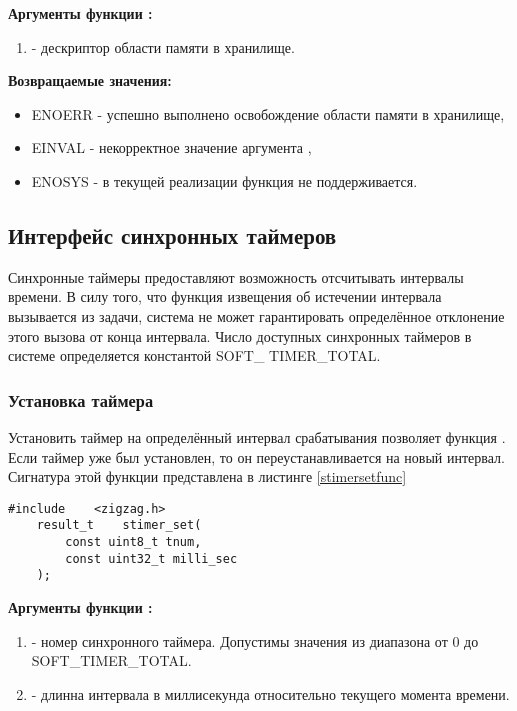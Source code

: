 {\bfseries Аргументы функции :}

{\itshape
\begin{enumerate} 
\item {} - дескриптор области памяти в хранилище.
\end{enumerate}
}

{\bfseries Возвращаемые значения:}

{\itshape
\begin{itemize}
\item ENOERR - успешно выполнено освобождение области памяти в хранилище,
\item EINVAL - некорректное значение аргумента ,
\item ENOSYS - в текущей реализации функция не поддерживается.
\end{itemize}
}

\subsection{Интерфейс синхронных таймеров}
    Синхронные таймеры предоставляют возможность отсчитывать интервалы времени.
В силу того, что функция извещения об истечении интервала вызывается из задачи,
система не может гарантировать определённое отклонение этого вызова от конца интервала.
Число доступных синхронных таймеров в системе определяется константой SOFT\_ TIMER\_TOTAL.

\subsubsection{ Установка таймера }
    Установить таймер на определённый интервал срабатывания позволяет функция .
Если таймер уже был установлен, то он переустанавливается на новый интервал.
Сигнатура этой функции представлена в листинге \ref{stimersetfunc}
\begin{lstlisting}[caption=Функция \myfunc{stimer\_set()} - установка синхронного таймера. , label=stimersetfunc]
    #include    <zigzag.h>
    result_t    stimer_set( 
        const uint8_t tnum, 
        const uint32_t milli_sec 
    );
\end{lstlisting}
{\bfseries Аргументы функции :}

{\itshape
\begin{enumerate} 
\item {} - номер синхронного таймера. Допустимы значения из диапазона от 0 до SOFT\_TIMER\_TOTAL.
\item {} - длинна интервала в миллисекунда относительно текущего момента времени.
\end{enumerate}
}

